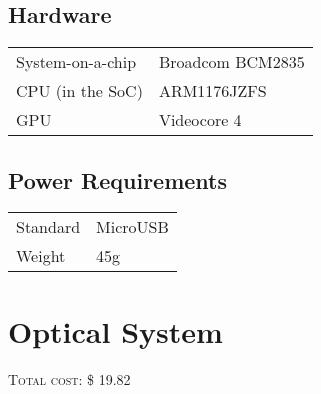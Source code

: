 \subsection{Hardware}

\begin{tabular}{p{} p{}} 
\hline
System-on-a-chip & Broadcom BCM2835 \\
CPU (in the SoC) & ARM1176JZFS \\
GPU & Videocore 4 \\ \hline
\end{tabular}

\subsection{Power Requirements}

\begin{tabular}{p{} p{}}
\hline
Standard & MicroUSB \\
Weight & 45g \\ \hline
\end{tabular}

\section{Optical System}
\nopagebreak
\textsc{Total cost: \$ 19.82}
